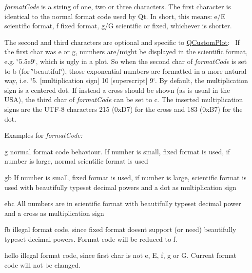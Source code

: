 {\itshape format\+Code} is a string of one, two or three characters. The first character is identical to the normal format code used by Qt. In short, this means\+: \textquotesingle{}e\textquotesingle{}/\textquotesingle{}E\textquotesingle{} scientific format, \textquotesingle{}f\textquotesingle{} fixed format, \textquotesingle{}g\textquotesingle{}/\textquotesingle{}G\textquotesingle{} scientific or fixed, whichever is shorter.

The second and third characters are optional and specific to \hyperlink{classQCustomPlot}{Q\+Custom\+Plot}\+:~\newline
If the first char was \textquotesingle{}e\textquotesingle{} or \textquotesingle{}g\textquotesingle{}, numbers are/might be displayed in the scientific format, e.\+g. \char`\"{}5.\+5e9\char`\"{}, which is ugly in a plot. So when the second char of {\itshape format\+Code} is set to \textquotesingle{}b\textquotesingle{} (for \char`\"{}beautiful\char`\"{}), those exponential numbers are formatted in a more natural way, i.\+e. \char`\"{}5.
\mbox{[}multiplication sign\mbox{]} 10 \mbox{[}superscript\mbox{]} 9\char`\"{}. By default, the multiplication sign is a centered dot. If instead a cross should be shown (as is usual in the U\+SA), the third char of {\itshape format\+Code} can be set to \textquotesingle{}c\textquotesingle{}. The inserted multiplication signs are the U\+T\+F-\/8 characters 215 (0x\+D7) for the cross and 183 (0x\+B7) for the dot.

Examples for {\itshape format\+Code\+:} \begin{DoxyItemize}
\item {\ttfamily g} normal format code behaviour. If number is small, fixed format is used, if number is large, normal scientific format is used \item {\ttfamily gb} If number is small, fixed format is used, if number is large, scientific format is used with beautifully typeset decimal powers and a dot as multiplication sign \item {\ttfamily ebc} All numbers are in scientific format with beautifully typeset decimal power and a cross as multiplication sign \item {\ttfamily fb} illegal format code, since fixed format doesn\textquotesingle{}t support (or need) beautifully typeset decimal powers. Format code will be reduced to \textquotesingle{}f\textquotesingle{}. \item {\ttfamily hello} illegal format code, since first char is not \textquotesingle{}e\textquotesingle{}, \textquotesingle{}E\textquotesingle{}, \textquotesingle{}f\textquotesingle{}, \textquotesingle{}g\textquotesingle{} or \textquotesingle{}G\textquotesingle{}. Current format code will not be changed. \end{DoxyItemize}
